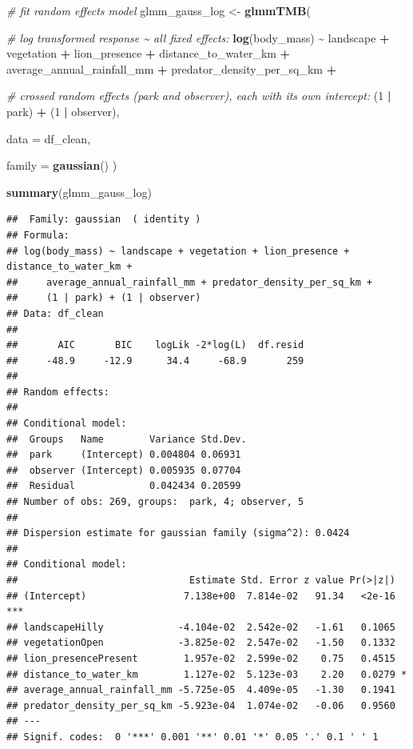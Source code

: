 \documentclass[
]{article}
\newenvironment{Shaded}{\begin{snugshade}}{\end{snugshade}}
\newcommand{\AttributeTok}[1]{\textcolor[rgb]{0.13,0.29,0.53}{#1}}
\newcommand{\CommentTok}[1]{\textcolor[rgb]{0.56,0.35,0.01}{\textit{#1}}}
\newcommand{\DecValTok}[1]{\textcolor[rgb]{0.00,0.00,0.81}{#1}}
\newcommand{\FunctionTok}[1]{\textcolor[rgb]{0.13,0.29,0.53}{\textbf{#1}}}
\newcommand{\NormalTok}[1]{#1}
\newcommand{\OtherTok}[1]{\textcolor[rgb]{0.56,0.35,0.01}{#1}}
\newcommand{\SpecialCharTok}[1]{\textcolor[rgb]{0.81,0.36,0.00}{\textbf{#1}}}
\begin{document}
\begin{Shaded}
\begin{Highlighting}[]
\CommentTok{\# fit random effects model}
\NormalTok{glmm\_gauss\_log }\OtherTok{\textless{}{-}} \FunctionTok{glmmTMB}\NormalTok{(}

  \CommentTok{\# log transformed response \textasciitilde{} all fixed effects:}
  \FunctionTok{log}\NormalTok{(body\_mass) }\SpecialCharTok{\textasciitilde{}}\NormalTok{ landscape }\SpecialCharTok{+}
\NormalTok{    vegetation }\SpecialCharTok{+}
\NormalTok{    lion\_presence }\SpecialCharTok{+}
\NormalTok{    distance\_to\_water\_km }\SpecialCharTok{+}
\NormalTok{    average\_annual\_rainfall\_mm }\SpecialCharTok{+}
\NormalTok{    predator\_density\_per\_sq\_km }\SpecialCharTok{+} 
    
    \CommentTok{\# crossed random effects (park and observer), each with its own intercept:}
\NormalTok{    (}\DecValTok{1} \SpecialCharTok{|}\NormalTok{ park) }\SpecialCharTok{+}
\NormalTok{    (}\DecValTok{1} \SpecialCharTok{|}\NormalTok{ observer),}
  
  \AttributeTok{data =}\NormalTok{ df\_clean,}
  
  \AttributeTok{family =} \FunctionTok{gaussian}\NormalTok{()}
\NormalTok{)}

\FunctionTok{summary}\NormalTok{(glmm\_gauss\_log)}
\end{Highlighting}
\end{Shaded}

\begin{verbatim}
##  Family: gaussian  ( identity )
## Formula:          
## log(body_mass) ~ landscape + vegetation + lion_presence + distance_to_water_km +  
##     average_annual_rainfall_mm + predator_density_per_sq_km +  
##     (1 | park) + (1 | observer)
## Data: df_clean
## 
##       AIC       BIC    logLik -2*log(L)  df.resid 
##     -48.9     -12.9      34.4     -68.9       259 
## 
## Random effects:
## 
## Conditional model:
##  Groups   Name        Variance Std.Dev.
##  park     (Intercept) 0.004804 0.06931 
##  observer (Intercept) 0.005935 0.07704 
##  Residual             0.042434 0.20599 
## Number of obs: 269, groups:  park, 4; observer, 5
## 
## Dispersion estimate for gaussian family (sigma^2): 0.0424 
## 
## Conditional model:
##                              Estimate Std. Error z value Pr(>|z|)    
## (Intercept)                 7.138e+00  7.814e-02   91.34   <2e-16 ***
## landscapeHilly             -4.104e-02  2.542e-02   -1.61   0.1065    
## vegetationOpen             -3.825e-02  2.547e-02   -1.50   0.1332    
## lion_presencePresent        1.957e-02  2.599e-02    0.75   0.4515    
## distance_to_water_km        1.127e-02  5.123e-03    2.20   0.0279 *  
## average_annual_rainfall_mm -5.725e-05  4.409e-05   -1.30   0.1941    
## predator_density_per_sq_km -5.923e-04  1.074e-02   -0.06   0.9560    
## ---
## Signif. codes:  0 '***' 0.001 '**' 0.01 '*' 0.05 '.' 0.1 ' ' 1
\end{verbatim}
\end{document}
